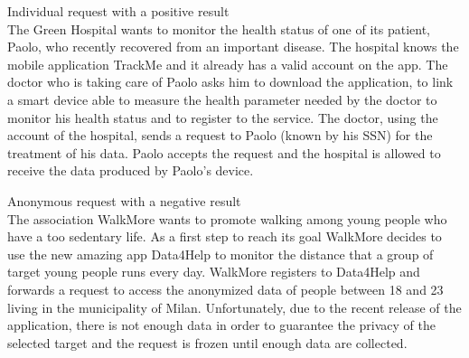 \documentclass{article}
\begin{document}
\begin{legal}
\begin{legal}
\begin{legal}
{\begin{legal}
		\item Individual request with a positive result\\
 
The Green Hospital wants to monitor the health status of one of its patient, Paolo, who recently recovered from an important disease. The hospital knows the mobile application TrackMe and it already has a valid account on the app. The doctor who is taking care of Paolo asks him to download the application, to link a smart device able to measure the health parameter needed by the doctor to monitor his health status and to register to the service. The doctor, using the account of the hospital, sends a request to Paolo (known by his SSN) for the treatment of his data. Paolo accepts the request and the hospital is allowed to receive the data produced by Paolo’s device.\\

		\item Anonymous request with a negative result\\

The association WalkMore wants to promote walking among young people who have a too sedentary life. As a first step to reach its goal WalkMore decides to use the new amazing app Data4Help to monitor the distance that a group of target young people runs every day. WalkMore registers to Data4Help and forwards a request to access the anonymized data of people between 18 and 23 living in the municipality of Milan. Unfortunately, due to the recent release of the application, there is not enough data in order to guarantee the privacy of the selected target and the request is frozen until enough data are collected.  \\


\end{legal}}
\end{legal}
\end{legal}
\end{legal}
\end{document}
